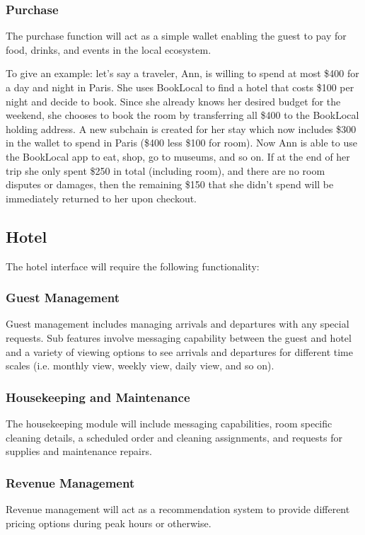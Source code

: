 \documentclass{article}
\begin{document}
\subsubsection{Purchase}
The purchase function will act as a simple wallet enabling the guest to pay for food, drinks, and events in the local ecosystem. 

\begin{flushleft}
To give an example: let's say a traveler, Ann, is willing to spend at most \$400 for a day and night in Paris. She uses BookLocal to find a hotel that costs \$100 per night and decide to book. Since she already knows her desired budget for the weekend, she chooses to book the room by transferring all \$400 to the BookLocal holding address. A new subchain is created for her stay which now includes \$300 in the wallet to spend in Paris (\$400 less \$100 for room). Now Ann is able to use the BookLocal app to eat, shop, go to museums, and so on. If at the end of her trip she only spent \$250 in total (including room), and there are no room disputes or damages, then the remaining \$150 that she didn't spend will be immediately returned to her upon checkout.
\end{flushleft}

\subsection{Hotel}
The hotel interface will require the following functionality:  

\subsubsection{Guest Management}
Guest management includes managing arrivals and departures with any special requests. Sub features involve messaging capability between the guest and hotel and a variety of viewing options to see arrivals and departures for different time scales (i.e. monthly view, weekly view, daily view, and so on).

\subsubsection{Housekeeping and Maintenance}
The housekeeping module will include messaging capabilities, room specific cleaning details, a scheduled order and cleaning assignments, and requests for supplies and maintenance repairs.

\subsubsection{Revenue Management}
Revenue management will act as a recommendation system to provide different pricing options during peak hours or otherwise. 
\end{document}
